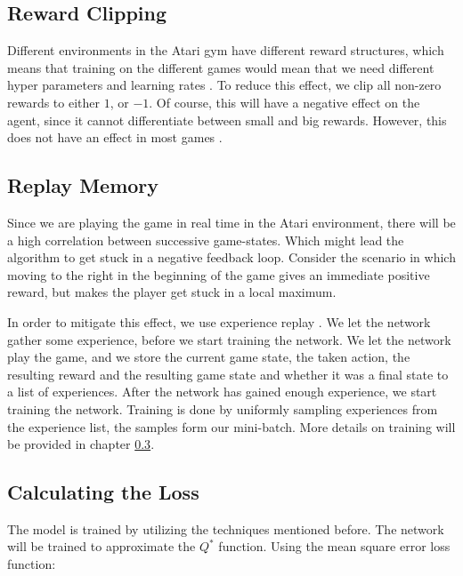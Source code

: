 \documentclass{article}
\begin{document}
\subsection{Reward Clipping}

Different environments in the Atari gym have different reward structures, which means that training on the different games would mean that we need different hyper parameters and learning rates . To reduce this effect, we clip all non-zero rewards to either $1$, or $-1$. Of course, this will have a negative effect on the agent, since it cannot differentiate between small and big rewards. However, this does not have an effect in most games \cite{mnih2015human}.


\subsection{Replay Memory}
Since we are playing the game in real time in the Atari environment, there will be a high correlation between successive game-states. Which might lead the algorithm to get stuck in a negative feedback loop. Consider the scenario in which moving to the right in the beginning of the game gives an immediate positive reward, but makes the player get stuck in a local maximum.

In order to mitigate this effect, we use experience replay \cite{mnih2013playing}. We let the network gather some experience, before we start training the network. We let the network play the game, and we store the current game state, the taken action, the resulting reward and the resulting game state and whether it was a final state to a list of experiences. After the network has gained enough experience, we start training the network. Training is done by uniformly sampling experiences from the experience list, the samples form our mini-batch. More details on training will be provided in chapter \ref{chapter:training}.

\subsection{Calculating the Loss} \label{chapter:training}

The model is trained by utilizing the techniques mentioned before. The network will be trained to approximate the $Q^*$ function. Using the mean square error loss function:
\end{document}
